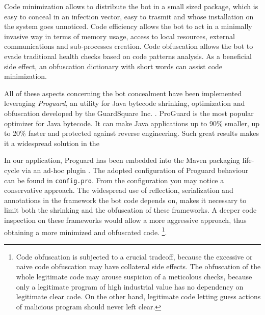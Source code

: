 Code minimization allows to distribute the bot in a small sized package, which is easy to conceal in an infection vector, easy to trasmit and whose installation on the system goes unnoticed.
Code efficiency allows the bot to act in a minimally invasive way in terms of memory usage, access to local resources, external communications and sub-processes creation.
Code obfuscation allows the bot to evade traditional health checks based on code patterns analysis. As a beneficial side effect, an obfuscation dictionary with short words can assist code minimization.

All of these aspects concerning the bot concealment have been implemented leveraging \textit{Proguard}, an utility for Java bytecode shrinking, optimization and obfuscation developed by the GuardSquare Inc. \cite{proguard}. ProGuard is the most popular optimizer for Java bytecode. It can make Java applications up to 90\% smaller, up to 20\% faster and protected against reverse engineering\cite{guardsquare}. Such great results makes it a widespread solution in the

In our application, Proguard has been embedded into the Maven packaging life-cycle via an ad-hoc plugin \cite{proguard-maven-plugin}. The adopted configuration of Proguard behaviour can be found in \texttt{config.pro}. From the configuration you may notice a conservative approach. The widespread use of reflection, serialization and annotations in the framework the bot code depends on, makes it necessary to limit both the shrinking and the obfuscation of these frameworks. A deeper code inspection on these frameworks would allow a more aggressive approach, thus obtaining a more minimized and obfuscated code. \footnote{Code obfuscation is subjected to a crucial tradeoff, because the excessive or naive code obfuscation may have collateral side effects. The obfuscation of the whole legitimate code may arouse suspicion of a meticolous checks, because only a legitimate program of high industrial value has no dependency on legitimate clear code. On the other hand, legitimate code letting guess actions of malicious program should never left clear.}.
